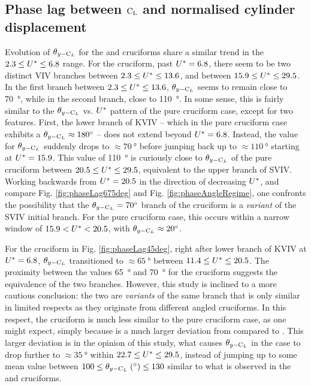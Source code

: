 \documentclass[oneside]{utmthesis}
\begin{document}
\subsection{Phase lag between $\text{C}_{\text{L}}$ and normalised cylinder displacement} \label{ssec:phaseLag67545}
Evolution of $\theta_{y-\text{C}_{L}}$ for the \angfo{} and \angth{} cruciforms share a similar trend in the $2.3 \leq U^{*} \leq 6.8$ range. For the \angfo{} cruciform, past $U^{*} = 6.8$, there seem to be two distinct VIV branches between $2.3 \leq U^{*} \leq 13.6$, and between $15.9 \leq U^{*} \leq 29.5$. In the first branch between $2.3 \leq U^{*} \leq 13.6$, $\theta_{y-\text{C}_{L}}$ seems to remain close to \SI{70}{\degree}, while in the second branch, close to \SI{110}{\degree}. In some sense, this is fairly similar to the $\theta_{y-\text{C}_{L}}$ vs. $U^{*}$ pattern of the pure cruciform case, except for two features. First, the lower branch of KVIV -- which in the pure cruciform case exhibits a $\plag \approx \SI{180}{\degree}$ -- does not extend beyond $U^{*} = 6.8$. Instead, the value for $\theta_{y-\text{C}_{L}}$ suddenly drops to $\approx \SI{70}{\degree}$ before jumping back up to $\approx \SI{110}{\degree}$ starting at $U^{*} = 15.9$. This value of \SI{110}{\degree} is curiously close to $\theta_{y-\text{C}_{L}}$ of the pure cruciform between $20.5 \leq U^{*} \leq 29.5$, equivalent to the upper branch of SVIV. Working backwards from $U^{*} = 20.5$ in the direction of decreasing $U^{*}$, and compare Fig. \ref{fig:phaseLag675deg} and Fig. \ref{fig:phaseAngleRegime}, one confronts the possibility that the $\plag = \SI{70}{\degree}$ branch of the \angfo cruciform is a \textit{variant} of the SVIV initial branch. For the pure cruciform case, this occurs within a narrow window of $15.9 < U^{*} < 20.5$, with $\plag \approx \SI{20}{\degree}$.

For the \angth{} cruciform in Fig. \ref{fig:phaseLag45deg}, right after lower branch of KVIV at $U^{*} = 6.8$, $\theta_{y-\text{C}_{L}}$ transitioned to $\approx \SI{65}{\degree}$ between $11.4 \leq U^{*} \leq 20.5$. The proximity between the values \SI{65}{\degree} and \SI{70}{\degree} for the \angfo{} cruciform suggests the equivalence of the two branches. However, this study is inclined to a more cautious conclusion: the two are \textit{variants} of the same branch that is only similar in limited respects as they originate from different angled cruciforms. In this respect, the \angth{} cruciform is much less similar to the pure cruciform case, as one might expect, simply because \angth{} is a much larger deviation from \angfi{} compared to \angfo{}. This larger deviation is in the opinion of this study, what causes $\theta_{y-\text{C}_{L}}$ in the \angth{} case to drop further to $\approx \SI{35}{\degree}$ within $22.7 \leq U^{*} \leq 29.5$, instead of jumping up to some mean value between $100 \leq \plag \; (\si{\degree}) \leq 130$ similar to what is observed in the \angfi{} and \angfo{} cruciforms.
\end{document}
